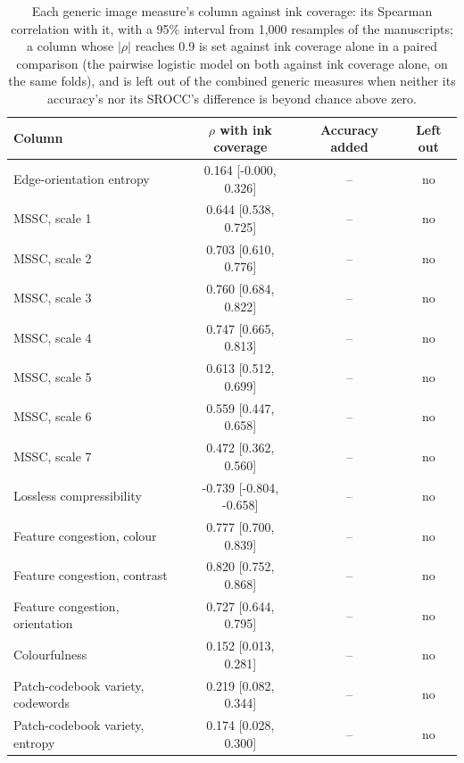 \begin{table}[htbp]
  \centering
  \caption{Each generic image measure's column against ink coverage: its Spearman correlation with it, with a 95\% interval from 1,000 resamples of the manuscripts; a column whose $|\rho|$ reaches 0.9 is set against ink coverage alone in a paired comparison (the pairwise logistic model on both against ink coverage alone, on the same folds), and is left out of the combined generic measures when neither its accuracy's nor its SROCC's difference is beyond chance above zero.}
  \label{tab:generic_measure_correlations}
  \begin{tabular}{lccc}
    \toprule
    Column & $\rho$ with ink coverage & Accuracy added & Left out \\
    \midrule
    Edge-orientation entropy & 0.164 [-0.000, 0.326] & -- & no \\
    MSSC, scale 1 & 0.644 [0.538, 0.725] & -- & no \\
    MSSC, scale 2 & 0.703 [0.610, 0.776] & -- & no \\
    MSSC, scale 3 & 0.760 [0.684, 0.822] & -- & no \\
    MSSC, scale 4 & 0.747 [0.665, 0.813] & -- & no \\
    MSSC, scale 5 & 0.613 [0.512, 0.699] & -- & no \\
    MSSC, scale 6 & 0.559 [0.447, 0.658] & -- & no \\
    MSSC, scale 7 & 0.472 [0.362, 0.560] & -- & no \\
    Lossless compressibility & -0.739 [-0.804, -0.658] & -- & no \\
    Feature congestion, colour & 0.777 [0.700, 0.839] & -- & no \\
    Feature congestion, contrast & 0.820 [0.752, 0.868] & -- & no \\
    Feature congestion, orientation & 0.727 [0.644, 0.795] & -- & no \\
    Colourfulness & 0.152 [0.013, 0.281] & -- & no \\
    Patch-codebook variety, codewords & 0.219 [0.082, 0.344] & -- & no \\
    Patch-codebook variety, entropy & 0.174 [0.028, 0.300] & -- & no \\
    \bottomrule
  \end{tabular}
\end{table}
